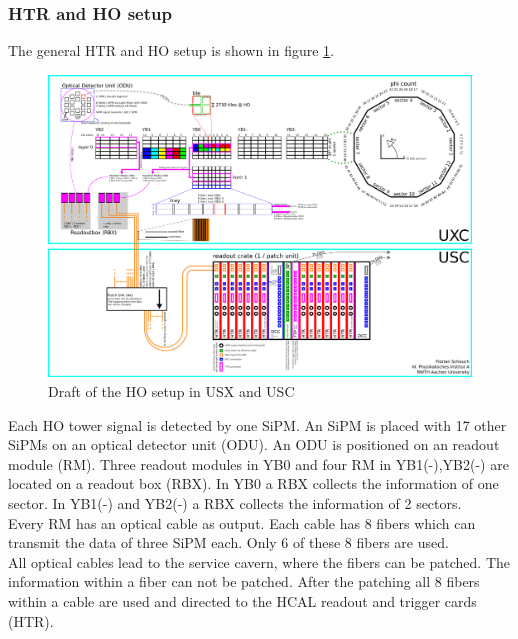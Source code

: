 \subsubsection{HTR and HO setup}
The general HTR and HO setup is shown in figure \ref{HOPlan}.\\
\begin{figure}[b]
\centering
\begin{minipage}[t]{0.95\textwidth}
\includegraphics[height=\textwidth, angle=90]{Figures/scheuch/Chart.png}
\caption{Draft of the HO setup in USX and USC}
\label{HOPlan}
\end{minipage}
\end{figure}
Each HO tower signal is detected by one SiPM. An SiPM is placed with 17 other SiPMs on an optical detector unit (ODU). An ODU is positioned on an readout module (RM). Three readout modules in YB0 and four RM in YB1(-),YB2(-) are located on a readout box (RBX). In YB0 a RBX collects the information of one sector. In YB1(-) and YB2(-) a RBX collects the information of 2 sectors.\\
Every RM has an optical cable as output. Each cable has 8 fibers which can transmit the data of three SiPM each. Only 6 of these 8 fibers are used.\\
All optical cables lead to the service cavern, where the fibers can be patched. The information within a fiber can not be patched. After the patching all 8 fibers within a cable are used and directed to the HCAL readout and trigger cards (HTR).\\
